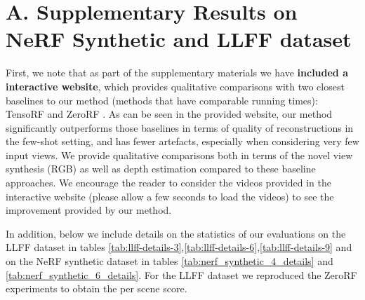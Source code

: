 \clearpage
\setcounter{page}{1}
\maketitlesupplementary

\section*{A. Supplementary Results on NeRF Synthetic and LLFF dataset}

First, we note that as part of the supplementary materials we have \textbf{included a interactive website}, which provides qualitative comparisons with two closest baselines to our method (methods that have comparable running times): TensoRF \cite{Chen2022ECCV} and ZeroRF \cite{shi2024zerorf}. As can be seen in the provided website, our method significantly outperforms those baselines in terms of quality of reconstructions in the few-shot setting, and has fewer artefacts, especially when considering very few input views. We provide qualitative comparisons both in terms of the novel view synthesis (RGB) as well as depth estimation compared to these baseline approaches. We encourage the reader to consider the videos provided in the interactive website (please allow a few seconds to load the videos) to see the improvement provided by our method.

In addition, below we include details on the statistics of our evaluations on the LLFF dataset in tables \ref{tab:llff-details-3},\ref{tab:llff-details-6},\ref{tab:llff-details-9} and on the NeRF synthetic dataset in tables \ref{tab:nerf_synthetic_4_details} and \ref{tab:nerf_synthetic_6_details}. For the LLFF dataset we reproduced the ZeroRF experiments to obtain the per scene score.

